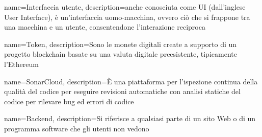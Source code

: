 {
	name={Interfaccia utente},
	description={anche conosciuta come UI (dall'inglese User Interface), è un'interfaccia uomo-macchina, ovvero ciò che si frappone tra una macchina e un utente, consentendone l'interazione reciproca}
}

{
	name={Token},
	description={Sono le monete digitali create a supporto di un progetto blockchain\glo{} basate su una valuta digitale preesistente, tipicamente l'Ethereum\glo}
}

{
	name={SonarCloud},
	description={È una piattaforma per l'ispezione continua della qualità del codice per eseguire revisioni automatiche con analisi statiche del codice per rilevare bug ed errori di codice}
}

{
	name={Backend},
	description={Si riferisce a qualsiasi parte di un sito Web o di un programma software che gli utenti non vedono}
}

